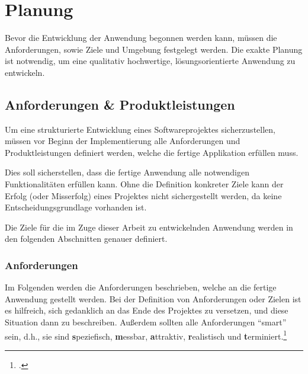 
\chapter{Planung}\label{cha:Planung}
Bevor die Entwicklung der Anwendung begonnen werden kann, müssen die Anforderungen, sowie Ziele und Umgebung festgelegt werden. Die exakte Planung ist notwendig, um eine qualitativ hochwertige, lösungsorientierte Anwendung zu entwickeln.


\section{Anforderungen \& Produktleistungen}\label{sec:AnforderungenUndPLs}
Um eine strukturierte Entwicklung eines Softwareprojektes sicherzustellen, müssen vor Beginn der Implementierung alle Anforderungen und Produktleistungen definiert werden, welche die fertige Applikation erfüllen muss.

Dies soll sicherstellen, dass die fertige Anwendung alle notwendigen Funktionalitäten erfüllen kann. Ohne die Definition konkreter Ziele kann der Erfolg (oder Misserfolg) eines Projektes nicht sichergestellt werden, da keine Entscheidungsgrundlage vorhanden ist.

Die Ziele für die im Zuge dieser Arbeit zu entwickelnden Anwendung werden in den folgenden Abschnitten genauer definiert.


\subsection{Anforderungen}\label{subsec:Anforderungen}
Im Folgenden werden die Anforderungen beschrieben, welche an die fertige Anwendung gestellt werden. Bei der Definition von Anforderungen oder Zielen ist es hilfreich, sich gedanklich an das Ende des Projektes zu versetzen, und diese Situation dann zu beschreiben. Außerdem sollten alle Anforderungen "`smart"' sein, d.h., sie sind \textbf{s}peziefisch, \textbf{m}essbar, \textbf{a}ttraktiv, \textbf{r}ealistisch und \textbf{t}erminiert.\footcite[Vgl.][S. 48]{Bauer.2014}

